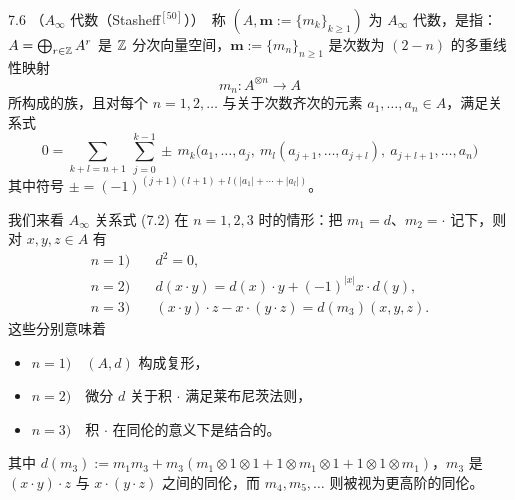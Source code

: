 
\begin{definition}{7.6}
（$A_\infty$ 代数（Stasheff$^{[50]}$））\ 称 $(A,\mathbf m:=\{m_{k}\}_{k\ge 1})$ 为 $A_\infty$ 代数，是指：$A=\bigoplus_{r\in\mathbb{Z}}A^{r}$ 是 $\mathbb{Z}$ 分次向量空间，$\mathbf m:=\{m_{n}\}_{n\ge 1}$ 是次数为 $(2-n)$ 的多重线性映射
\[
  m_{n}\colon A^{\otimes n}\longrightarrow A
\]
所构成的族，且对每个 $n=1,2,\dots$ 与关于次数齐次的元素 $a_{1},\dots,a_{n}\in A$，满足关系式
\begin{equation}
  0=\sum_{k+l=n+1}\ \sum_{j=0}^{k-1}\pm\,m_{k}\bigl(a_{1},\dots,a_{j},\ m_{l}(a_{j+1},\dots,a_{j+l}),\ a_{j+l+1},\dots,a_{n}\bigr) \tag{7.2}
\end{equation}
其中符号 $\pm=(-1)^{(j+1)(l+1)+l(|a_{1}|+\cdots+|a_{l}|)}$。
\end{definition}


我们来看 $A_\infty$ 关系式 (7.2) 在 $n=1,2,3$ 时的情形：把 $m_{1}=d$、$m_{2}=\cdot$ 记下，则对 $x,y,z\in A$ 有
\begin{align*}
  n=1)&\quad d^{2}=0,\\
  n=2)&\quad d(x\cdot y)=d(x)\cdot y+(-1)^{|x|}x\cdot d(y),\\
  n=3)&\quad (x\cdot y)\cdot z-x\cdot(y\cdot z)=d(m_{3})(x,y,z).
\end{align*}
这些分别意味着
\begin{itemize}[leftmargin=2em,itemsep=1pt,topsep=2pt]
  \item $n=1)$\ \ $(A,d)$ 构成复形，
  \item $n=2)$\ \ 微分 $d$ 关于积 $\cdot$ 满足莱布尼茨法则，
  \item $n=3)$\ \ 积 $\cdot$ 在同伦的意义下是结合的。
\end{itemize}
其中 $d(m_{3}):=m_{1}m_{3}+m_{3}(m_{1}\otimes 1\otimes 1+1\otimes m_{1}\otimes 1+1\otimes 1\otimes m_{1})$，$m_{3}$ 是 $(x\cdot y)\cdot z$ 与 $x\cdot(y\cdot z)$ 之间的同伦，而 $m_{4},m_{5},\dots$ 则被视为更高阶的同伦。

